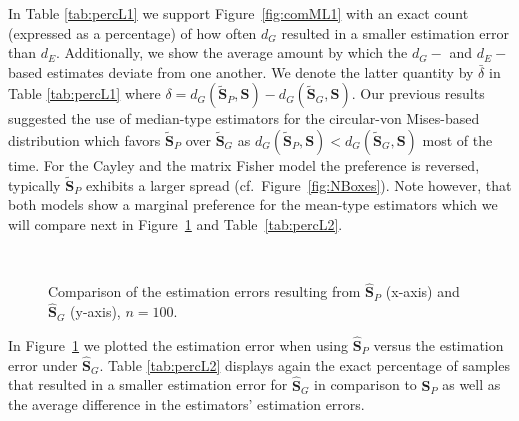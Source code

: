 \noindent In Table \ref{tab:percL1} we support Figure~\ref{fig:comML1} with an exact count (expressed as a percentage) of how often $d_G$ resulted in a smaller estimation error than $d_E$.  Additionally, we show the average amount by which the $d_G-$ and $d_E-$based estimates deviate from one another.  We denote the latter quantity by $\bar\delta$ in Table \ref{tab:percL1} where  $\delta=d_G(\widetilde{\bm S}_P,\bm S)-d_G(\widetilde{\bm S}_{G},\bm S)$.    
Our previous results suggested the use of median-type estimators for the circular-von Mises-based distribution which favors $\widetilde{\bm S}_{P}$ over $\widetilde{\bm S}_{G}$ as $d_G(\widetilde{\bm S}_{P},\bm S) < d_G(\widetilde{\bm S}_G,\bm S)$ most of the time.  For the Cayley and the matrix Fisher model the preference is reversed, typically  $\widetilde{\bm S}_{P}$ exhibits a larger spread (cf.~Figure~\ref{fig:NBoxes}). Note however, that both models show a marginal preference for the mean-type estimators which we will compare next in Figure~\ref{fig:comPL2} and Table~\ref{tab:percL2}.


\begin{figure}[h]
\centering
{}\\
\caption{Comparison of the estimation errors resulting from $\widehat{\bm{S}}_P$ (x-axis) and $\widehat{\bm{S}}_{G}$ (y-axis), $n=100$.
}
\label{fig:comPL2}
\end{figure}

In Figure~\ref{fig:comPL2} we plotted the estimation error when using $\widehat{\bm{S}}_{P}$ versus the estimation error under $\widehat{\bm{S}}_{G}$. Table \ref{tab:percL2} displays again the exact percentage of samples that resulted in a smaller estimation error for $\widehat{\bm{S}}_{G}$ in comparison to $\widehat{\bm{S}}_{P}$ as well as the average difference in the estimators' estimation errors.

